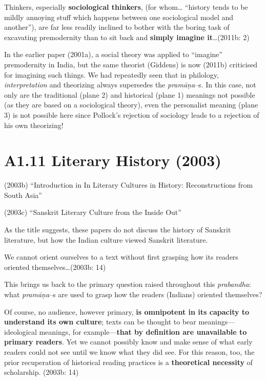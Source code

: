 \begin{myquote}
Thinkers, especially \textbf{sociological thinkers}, (for whom… “history tends to be mildly annoying stuff which happens between one sociological model and another”), are far less readily inclined to bother with the boring task of excavating premodernity than to sit back and \textbf{simply imagine it}…(2011b: 2)
\end{myquote}

In the earlier paper (2001a), a social theory was applied to “imagine” premodernity in India, but the same theorist (Giddens) is now (2011b) criticised for imagining such things. We had repeatedly seen that in philology, \textit{interpretation} and theorizing always supersedes the \textit{pramāṇa}–s. In this case, not only are the traditional (plane 2) and historical (plane 1) meanings not possible (as they are based on a sociological theory), even the personalist meaning (plane 3) is not possible here since Pollock’s rejection of sociology leads to a rejection of his own theorizing!


\section*{A1.11 Literary History (2003)}

\item (2003b) “Introduction in In Literary Cultures in History: Reconstructions from South Asia”

 \item (2003c) “Sanskrit Literary Culture from the Inside Out”

As the title suggests, these papers do not discuss the history of Sanskrit literature, but how the Indian culture viewed Sanskrit literature.

\begin{myquote}
We cannot orient ourselves to a text without ﬁrst grasping how its readers oriented themselves…(2003b: 14)
\end{myquote}

This brings us back to the primary question raised throughout this \textit{prabandha}: what \textit{pramāṇa}–s are used to grasp how the readers (Indians) oriented themselves?

\begin{myquote}
Of course, no audience, however primary, \textbf{is omnipotent in its capacity to understand its own culture}; texts can be thought to bear meanings—ideological meanings, for example—\textbf{that by deﬁnition are unavailable to primary readers}. Yet we cannot possibly know and make sense of what early readers could not see until we know what they did see. For this reason, too, the prior recuperation of historical reading practices is a \textbf{theoretical necessity} of scholarship. (2003b: 14)
\end{myquote}

